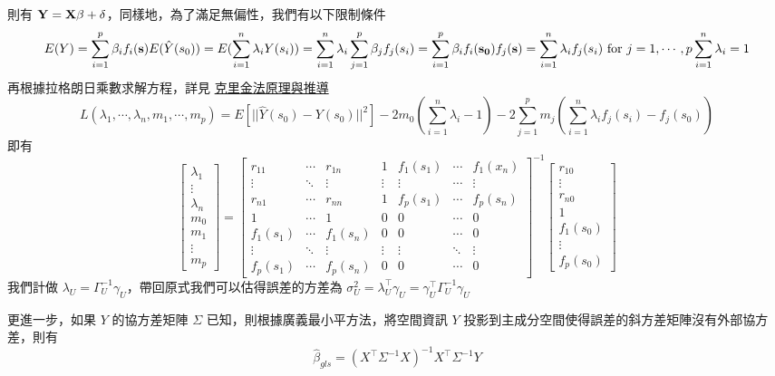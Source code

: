\documentclass[
]{book}
\begin{document}
則有 \(\bf Y = X\beta + \delta\)，同樣地，為了滿足無偏性，我們有以下限制條件
\[
E(Y) = \sum_{i=1}^p\beta_if_i(\mathbf{s}) \\
E(\hat Y(s_0)) = E(\sum_{i=1}^n\lambda_iY(s_i)) = \sum_{i=1}^n\lambda_i\sum_{j=1}^p\beta_jf_j(s_i) = \sum_{i=1}^p\beta_if_i(\mathbf{s_0}) \\
f_j(\mathbf{s}) = \sum_{i=1}^n\lambda_if_j(s_i) \mbox{ for } j = 1,\cdots,p \\
\sum_{i=1}^n\lambda_i = 1
\]
再根據拉格朗日乘數求解方程，詳見 \href{http://www1.mate.polimi.it/~bonavent/Homepage_Luca_file/lezkrig005.pdf}{克里金法原理與推導}
\[
L(\lambda_1,\cdots,\lambda_n,m_1,\cdots,m_p) = E[||\hat Y(s_0) - Y(s_0)||^2] - 2m_0(\sum_{i=1}^n\lambda_i-1) - 2\sum_{j=1}^pm_j(\sum_{i=1}^n\lambda_if_j(s_i) - f_j(s_0))
\]
即有
\[
\begin{bmatrix}
\lambda_1 \\
\vdots \\
\lambda_n \\
m_0 \\
m_1 \\
\vdots  \\
m_p
\end{bmatrix} = \begin{bmatrix}
r_{11}  & \cdots & r_{1n} &1& f_1(s_1) & \cdots & f_1(x_n)\\
 \vdots & \ddots & \vdots  &\vdots& \vdots & \cdots & \vdots\\
r_{n1}  & \cdots & r_{nn} &1& f_p(s_1) & \cdots & f_p(s_n)\\
1&\cdots&1&0&0&\cdots&0 \\
f_1(s_1)  & \cdots & f_1(s_n) &0& 0 & \cdots & 0\\
 \vdots & \ddots & \vdots &\vdots& \vdots & \ddots & \vdots\\
 f_p(s_1) & \cdots & f_p(s_n) & 0 & 0 & \cdots &0
\end{bmatrix}^{-1}\begin{bmatrix}
r_{10} \\
\vdots \\
r_{n0} \\
1 \\
f_1(s_0) \\
\vdots \\
f_p(s_0)
\end{bmatrix}
\]
我們計做 \(\lambda_U = \Gamma_U^{-1}\gamma_U\)，帶回原式我們可以估得誤差的方差為 \(\sigma^2_U =\lambda_U^\top\gamma_U= \gamma_U^\top \Gamma_U^{-1}\gamma_U\)

更進一步，如果 \(Y\) 的協方差矩陣 \(\Sigma\) 已知，則根據廣義最小平方法，將空間資訊 \(Y\) 投影到主成分空間使得誤差的斜方差矩陣沒有外部協方差，則有
\[
\hat\beta_{gls} = (X^\top\Sigma^{-1} X)^{-1}X^\top\Sigma^{-1} Y
\]
\end{document}
